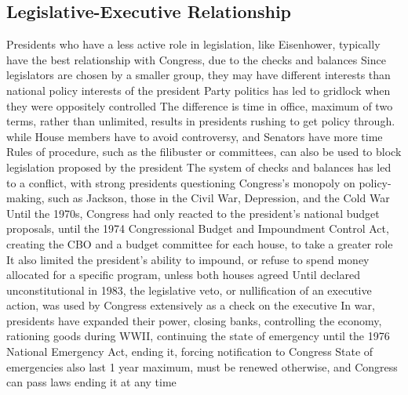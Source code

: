 \documentclass[11 pt, twoside]{article}
\newenvironment{outline*}
{
	\begin{outline}[enumerate]
	}
	{\end{outline}
}
\begin{document}
\subsection{Legislative-Executive Relationship}
\begin{outline*}
\1 Presidents who have a less active role in legislation, like Eisenhower, typically have the best relationship with Congress, due to the checks and balances
\2 Since legislators are chosen by a smaller group, they may have different interests than national policy interests of the president
\2 Party politics has led to gridlock when they were oppositely controlled
\2 The difference is time in office, maximum of two terms, rather than unlimited, results in presidents rushing to get policy through. while House members have to avoid controversy, and Senators have more time
\2 Rules of procedure, such as the filibuster or committees, can also be used to block legislation proposed by the president
\1 The system of checks and balances has led to a conflict, with strong presidents questioning Congress’s monopoly on policy-making, such as Jackson, those in the Civil War, Depression, and the Cold War
\1 Until the 1970s, Congress had only reacted to the president’s national budget proposals, until the 1974 Congressional Budget and Impoundment Control Act, creating the CBO and a budget committee for each house, to take a greater role
\2 It also limited the president’s ability to impound, or refuse to spend money allocated for a specific program, unless both houses agreed
\1 Until declared unconstitutional in 1983, the legislative veto, or nullification of an executive action, was used by Congress extensively as a check on the executive
\1 In war, presidents have expanded their power, closing banks, controlling the economy, rationing goods during WWII, continuing the state of emergency until the 1976 National Emergency Act, ending it, forcing notification to Congress
\2 State of emergencies also last 1 year maximum, must be renewed otherwise, and Congress can pass laws ending it at any time
\end{outline*}
\end{document}
